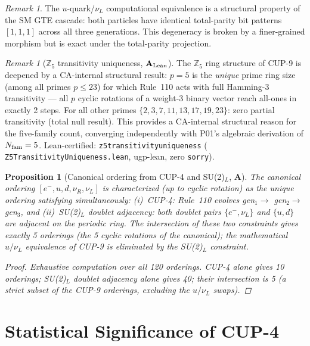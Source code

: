 \documentclass[11pt]{article}
\newtheorem{proposition}[theorem]{Proposition}
\theoremstyle{remark}
\newtheorem{remark}[theorem]{Remark}
\newcommand{\lean}[1]{%
  \penalty-100
  \begingroup\def\_{\textunderscore\allowbreak}\texttt{#1}\endgroup}
\newcommand{\CatA}{\textbf{A}}
\newcommand{\CatAL}{\ensuremath{\textbf{A}_{\rm Lean}}}
\begin{document}
\begin{remark}
The $u$-quark/$\nu_L$ computational equivalence is a structural property of the SM GTE
cascade: both particles have identical total-parity bit patterns $[1,1,1]$ across all
three generations. This degeneracy is broken by a finer-grained morphism but is exact
under the total-parity projection.
\end{remark}

\begin{remark}[$\mathbb{Z}_5$ transitivity uniqueness, $\CatAL$]
The $\mathbb{Z}_5$ ring structure of CUP-9 is deepened by a CA-internal structural result:
$p=5$ is the \emph{unique} prime ring size (among all primes $p \leq 23$) for which Rule~110
acts with full Hamming-3 transitivity --- all $p$ cyclic rotations of a weight-3 binary
vector reach all-ones in exactly 2 steps.
For all other primes $\{2,3,7,11,13,17,19,23\}$: zero partial transitivity (total null result).
This provides a CA-internal structural reason for the five-family count, converging
independently with P01's algebraic derivation of $N_{\rm fam}=5$.
Lean-certified: \lean{z5\_transitivity\_uniqueness} (\lean{Z5Transitivity\-Uniqueness.lean},
ugp-lean, zero \texttt{sorry}).
\end{remark}

\begin{proposition}[Canonical ordering from CUP-4 and SU(2)$_L$, $\CatA$]
\label{prop:ordering}
The canonical ordering $[e^-, u, d, \nu_R, \nu_L]$ is characterized (up to cyclic rotation)
as the unique ordering satisfying simultaneously:
(i)~CUP-4: Rule~110 evolves gen$_1 \to$ gen$_2 \to$ gen$_3$, and
(ii)~SU(2)$_L$ doublet adjacency: both doublet pairs $\{e^-, \nu_L\}$ and $\{u, d\}$
are adjacent on the periodic ring.
The intersection of these two constraints gives exactly 5 orderings (the 5 cyclic
rotations of the canonical); the mathematical $u/\nu_L$ equivalence of CUP-9 is
eliminated by the SU(2)$_L$ constraint.
\begin{proof}
Exhaustive computation over all 120 orderings.
CUP-4 alone gives 10 orderings; SU(2)$_L$ doublet adjacency alone gives 40; their
intersection is 5 (a strict subset of the CUP-9 orderings, excluding the $u/\nu_L$ swaps).
\end{proof}
\end{proposition}

\section{Statistical Significance of CUP-4}
\label{sec:stat}
\end{document}
